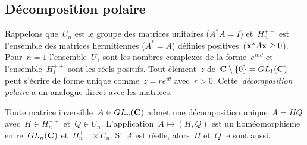 






%
%
%
%
%
%
%
%

\subsection{Décomposition polaire}

Rappelons que~$U_n$ est le groupe des matrices unitaires ($A^*A=I$)
et~$H_n^{++}$ est l'ensemble des matrices hermitiennes ($A^*=A$) définies
positives~($\mathbf{x}^*A\mathbf{x}\ge 0$).  Pour~$n=1$ l'ensemble~$U_1$ sont les nombres
complexes de la forme~$e^{in\theta}$ et l'ensemble~$H_1^{++}$ sont les réels
positifs.  Tout élément~$z$ de~$\mathbf{C}\setminus\{0\}=GL_1(\mathbf{C})$ peut s'écrire de
forme unique comme~$z=re^{i\theta}$ avec~$r>0$.  Cette~\emph{décomposition
polaire} a un analogue direct avec les matrices.

\begin{theorem}
	\label{thm:polaire}
	Toute matrice inversible~$A\in GL_n(\mathbf{C})$ admet une décomposition
	unique~$A=HQ$ avec~$H\in H_n^{++}$ et~$Q\in U_n$.
	L'application~$A\mapsto(H,Q)$ est un homéomorphisme entre~$GL_n(\mathbf{C})$
	et~$H_n^{++}\times U_n$.
	Si~$A$ est réelle, alors~$H$ et~$Q$ le sont
	aussi.
\end{theorem}

